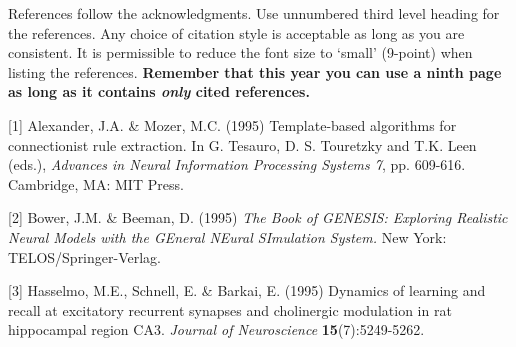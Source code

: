 \documentclass{article} %
\begin{document}
References follow the acknowledgments. Use unnumbered third level heading for
the references. Any choice of citation style is acceptable as long as you are
consistent. It is permissible to reduce the font size to `small' (9-point) 
when listing the references. {\bf Remember that this year you can use
a ninth page as long as it contains \emph{only} cited references.}

\small{
[1] Alexander, J.A. \& Mozer, M.C. (1995) Template-based algorithms
for connectionist rule extraction. In G. Tesauro, D. S. Touretzky
and T.K. Leen (eds.), {\it Advances in Neural Information Processing
Systems 7}, pp. 609-616. Cambridge, MA: MIT Press.

[2] Bower, J.M. \& Beeman, D. (1995) {\it The Book of GENESIS: Exploring
Realistic Neural Models with the GEneral NEural SImulation System.}
New York: TELOS/Springer-Verlag.

[3] Hasselmo, M.E., Schnell, E. \& Barkai, E. (1995) Dynamics of learning
and recall at excitatory recurrent synapses and cholinergic modulation
in rat hippocampal region CA3. {\it Journal of Neuroscience}
{\bf 15}(7):5249-5262.
}
\end{document}
